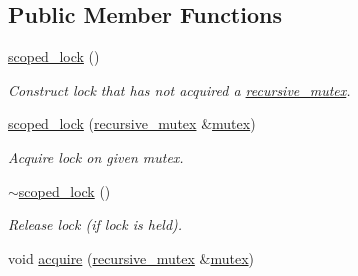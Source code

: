 \subsection*{Public Member Functions}
\begin{DoxyCompactItemize}
\item 
\hypertarget{classtbb_1_1recursive__mutex_1_1scoped__lock_a0a9962a3932cfbd0d12cb197494f951b}{}\hyperlink{classtbb_1_1recursive__mutex_1_1scoped__lock_a0a9962a3932cfbd0d12cb197494f951b}{scoped\+\_\+lock} ()\label{classtbb_1_1recursive__mutex_1_1scoped__lock_a0a9962a3932cfbd0d12cb197494f951b}

\begin{DoxyCompactList}\small\item\em Construct lock that has not acquired a \hyperlink{classtbb_1_1recursive__mutex}{recursive\+\_\+mutex}. \end{DoxyCompactList}\item 
\hypertarget{classtbb_1_1recursive__mutex_1_1scoped__lock_ab42cb541abb9647cac23b1db9a4db93d}{}\hyperlink{classtbb_1_1recursive__mutex_1_1scoped__lock_ab42cb541abb9647cac23b1db9a4db93d}{scoped\+\_\+lock} (\hyperlink{classtbb_1_1recursive__mutex}{recursive\+\_\+mutex} \&\hyperlink{classtbb_1_1mutex}{mutex})\label{classtbb_1_1recursive__mutex_1_1scoped__lock_ab42cb541abb9647cac23b1db9a4db93d}

\begin{DoxyCompactList}\small\item\em Acquire lock on given mutex. \end{DoxyCompactList}\item 
\hypertarget{classtbb_1_1recursive__mutex_1_1scoped__lock_a90a966e19120aac99b36a3d6d04af1a2}{}\hyperlink{classtbb_1_1recursive__mutex_1_1scoped__lock_a90a966e19120aac99b36a3d6d04af1a2}{$\sim$scoped\+\_\+lock} ()\label{classtbb_1_1recursive__mutex_1_1scoped__lock_a90a966e19120aac99b36a3d6d04af1a2}

\begin{DoxyCompactList}\small\item\em Release lock (if lock is held). \end{DoxyCompactList}\item 
\hypertarget{classtbb_1_1recursive__mutex_1_1scoped__lock_ac5450ce6a5813f395afaa434384c6539}{}void \hyperlink{classtbb_1_1recursive__mutex_1_1scoped__lock_ac5450ce6a5813f395afaa434384c6539}{acquire} (\hyperlink{classtbb_1_1recursive__mutex}{recursive\+\_\+mutex} \&\hyperlink{classtbb_1_1mutex}{mutex})\label{classtbb_1_1recursive__mutex_1_1scoped__lock_ac5450ce6a5813f395afaa434384c6539}


\end{DoxyCompactItemize}
